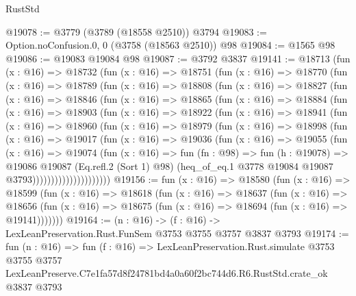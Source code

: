 \begin{lexlean}{RustStd}
\begin{coremodule}
@19078 := @3779 (@3789 (@18558 @2510)) @3794
@19083 := Option.noConfusion.{0, 0} (@3758 (@18563 @2510)) @98
@19084 := @1565 @98
@19086 := @19083 @19084 @98
@19087 := @3792 @3837
@19141 := @18713
    (fun (x : @16) =>
    @18732
      (fun (x : @16) =>
      @18751
        (fun (x : @16) =>
        @18770
          (fun (x : @16) =>
          @18789
            (fun (x : @16) =>
            @18808
              (fun (x : @16) =>
              @18827
                (fun (x : @16) =>
                @18846
                  (fun (x : @16) =>
                  @18865
                    (fun (x : @16) =>
                    @18884
                      (fun (x : @16) =>
                      @18903
                        (fun (x : @16) =>
                        @18922
                          (fun (x : @16) =>
                          @18941
                            (fun (x : @16) =>
                            @18960
                              (fun (x : @16) =>
                              @18979
                                (fun (x : @16) =>
                                @18998
                                  (fun (x : @16) =>
                                  @19017
                                    (fun (x : @16) =>
                                    @19036
                                      (fun (x : @16) =>
                                      @19055
                                        (fun (x : @16) =>
                                        @19074
                                          (fun (x : @16) =>
                                          fun (fn : @98) =>
                                          fun (h : @19078) =>
                                          @19086
                                            @19087
                                            (Eq.refl.{2} (Sort 1) @98)
                                            (heq_of_eq.{1}
                                              @3778
                                              @19084
                                              @19087
                                              @3793)))))))))))))))))))))
@19156 := fun (x : @16) =>
  @18580
    (fun (x : @16) =>
    @18599
      (fun (x : @16) =>
      @18618
        (fun (x : @16) =>
        @18637
          (fun (x : @16) =>
          @18656 (fun (x : @16) => @18675 (fun (x : @16) => @18694 (fun (x : @16) => @19141)))))))
@19164 := (n : @16) -> (f : @16) -> LexLeanPreservation.Rust.FunSem @3753 @3755 @3757 @3837 @3793
@19174 := fun (n : @16) =>
  fun (f : @16) =>
  LexLeanPreservation.Rust.simulate
    @3753
    @3755
    @3757
    LexLeanPreserve.C7e1fa57d8f24781bd4a0a60f2bc744d6.R6.RustStd.crate_ok
    @3837
    @3793
\end{coremodule}
\end{lexlean}

